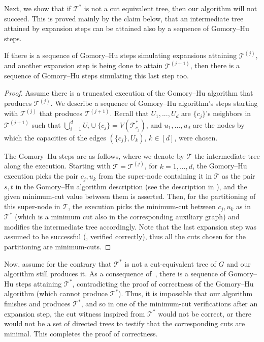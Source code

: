 \documentclass{toc}
\theoremstyle{plain}
\newcommand{\T}{\mathcal{T}}
\newcommand{\TG}{\mathcal{T}^*}
\providecommand{\set}[1]{{\{#1\}}}
\begin{document}
Next, we show that if $\TG$ is not a cut equivalent tree, then our algorithm will not succeed.
This is proved mainly by the claim below,
that an intermediate tree attained by expansion steps can be attained also by a sequence of Gomory--Hu steps.

\begin{claim}\label{claim:GH}
If there is a sequence of Gomory--Hu steps simulating  expansions attaining ${\T}^{(j)}$, and another expansion step is being done to attain ${\T}^{(j+1)}$, then there is a sequence of Gomory--Hu steps simulating this last step too.
\end{claim}

\begin{proof}
Assume there is a truncated execution of the Gomory--Hu algorithm that produces ${\T}^{(j)}$. We describe a sequence of Gomory--Hu algorithm's steps starting with ${\T}^{(j)}$ that produces ${\T}^{(j+1)}$.
Recall that $U_{1},...,U_{d}$ are $\set{c_j}$'s neighbors in $\T^{(j+1)}$ such that $\bigcup_{i=1}^d U_i\cup \set{c_j} = V(\TG_{c_j})$,
and $u_{1},...,u_{d}$ are the nodes by which the capacities of the edges $(\set{c_j},U_k)$, $k\in [d]$, were chosen.

The Gomory--Hu steps are as follows, where we denote by $\T$ the intermediate tree along the execution.
Starting with $\T=\T^{(j)}$, for $k=1,...,d$, the Gomory--Hu execution picks the pair $c_j,u_{k}$ from the super-node containing it in $\T$ as the pair $s,t$ in the Gomory--Hu algorithm description (see the description in ), and the given minimum-cut value between them is asserted. Then, for the partitioning of this super-node in $\T$, the execution picks the minimum-cut between $c_j,u_{k}$ as in $\TG$ (which is a minimum cut also in the corresponding auxiliary graph) and modifies the intermediate tree accordingly. Note that the last expansion step was assumed to be successful (\ie, verified correctly), thus all the cuts chosen for the partitioning are minimum-cuts.
\end{proof}

Now, assume for the contrary that $\TG$ is not a cut-equivalent tree of $G$ and our algorithm still produces it.
As a consequence of~, there is a sequence of Gomory--Hu steps attaining $\TG$, contradicting the proof of correctness of the Gomory--Hu algorithm (which cannot produce $\TG$).
Thus, it is impossible that our algorithm finishes and produces $\TG$, and so in one of the minimum-cut verifications after an expansion step, the cut witness inspired from $\TG$ would not be correct, or there would not be a set of directed trees to testify that the corresponding cuts are minimal. This completes the proof of correctness.
\end{document}
